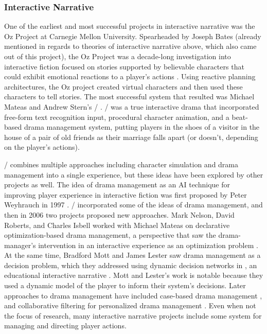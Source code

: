 \subsubsection{Interactive Narrative}

One of the earliest and most successful projects in interactive narrative was the Oz Project at Carnegie Mellon University.
%
Spearheaded by Joseph Bates (already mentioned in regards to theories of interactive narrative above, which also came out of this project), the Oz Project was a decade-long investigation into interactive fiction focused on stories supported by believable characters that could exhibit emotional reactions to a player's actions \citep{Bates1992}.
%
Using reactive planning architectures, the Oz project created virtual characters and then used these characters to tell stories.
%
The most successful system that resulted was Michael Mateas and Andrew Stern's \facade/ \citep{Mateas2002b}.
%
\facade/ was a true interactive drama that incorporated free-form text recognition input, procedural character animation, and a beat-based drama management system, putting players in the shoes of a visitor in the house of a pair of old friends as their marriage falls apart (or doesn't, depending on the player's actions).


\facade/ combines multiple approaches including character simulation and drama management into a single experience, but these ideas have been explored by other projects as well.
%
The idea of drama management as an AI technique for improving player experience in interactive fiction was first proposed by Peter Weyhrauch in 1997 \citep{Weyhrauch1997}.
%
\facade/ incorporated some of the ideas of drama management, and then in 2006 two projects proposed new approaches.
%
Mark Nelson, David Roberts, and Charles Isbell worked with Michael Mateas on declarative optimization-based drama management, a perspective that saw the drama-manager's intervention in an interactive experience as an optimization problem \citep{Nelson2006}.
%
At the same time, Bradford Mott and James Lester saw drama management as a decision problem, which they addressed using dynamic decision networks in , an educational interactive narrative \citep{Mott2006}.
%
Mott and Lester's work is notable because they used a dynamic model of the player to inform their system's decisions.
%
Later approaches to drama management have included case-based drama management \citep{Sharma2010}, and collaborative filtering for personalized drama management \citep{Yu2013}.
%
Even when not the focus of research, many interactive narrative projects include some system for managing and directing player actions.


